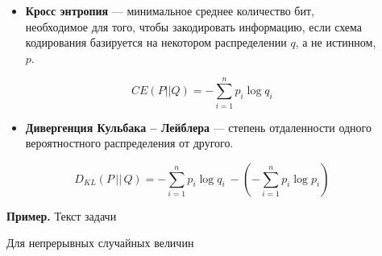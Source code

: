 \documentclass[final]{beamer}
\newlength{\sepwid}
\newlength{\onecolwid}
\newlength{\twocolwid}
\begin{document}
\begin{frame}[t]
\begin{columns}[t]
\begin{column}{\onecolwid}
\end{column} %

\begin{column}{\sepwid}\end{column} %

\begin{column}{\twocolwid} %

\begin{columns}[t,totalwidth=\twocolwid] %

\begin{column}{\onecolwid}\vspace{-.6in} %




\begin{itemize}
	\item \textbf{Кросс энтропия} --- минимальное среднее количество бит, необходимое для того, чтобы закодировать информацию, если схема кодирования базируется на некотором распределении $q$, а не истинном, $p$.
	
	\[CE(P||Q)=-\sum\limits_{i=1}^{n}p_i\log q_i \]
	
	\item \textbf{Дивергенция Кульбака -- Лейблера} --- степень отдаленности одного вероятностного распределения от другого.
	
	\[D_{KL}(P\, ||\, Q)=  - \sum\limits_{i=1}^n p_i\log q_i\ - ( - \sum\limits_{i=1}^n p_i\log p_i)\]
\end{itemize}
	
\textbf{Пример.} Текст задачи

\begin{block}{Для непрерывных случайных величин}


\end{block}
\end{column}
\end{columns}
\end{column}
\end{columns}
\end{frame}
\end{document}
